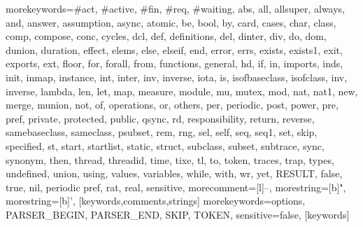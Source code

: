   {morekeywords={\#act, \#active, \#fin, \#req, \#waiting, abs, all, allsuper, always, and, answer, 
     assumption, async, atomic, be, bool, by, card, cases, char, class, comp, compose, conc, cycles,
     dcl, def, definitions, del, dinter, div, do, dom, dunion, duration, effect, elems, else, elseif, end,
     error, errs, exists, exists1, exit, exports, ext, floor, for, forall, from, functions, 
     general, hd, if, in, imports, inds, init, inmap, instance, int, inter, inv, inverse, iota, is, 
     isofbaseclass, isofclass, inv, inverse, lambda, len, let, map,
     measure, module,
     mu, mutex, mod, nat, nat1, new, merge, 
     munion, not, of, operations, or, others, per, periodic, post, power, pre, pref, 
     private, protected, public, qsync, rd, responsibility, return, reverse, samebaseclass, 
     sameclass, psubset, rem, rng, sel, self, seq, seq1, set, skip, specified, st, 
     start, startlist, static, struct, subclass, subset, subtrace, sync, synonym, then, thread, 
     threadid, time, tixe, tl, to, token, traces, trap, types, undefined, union, using, values, 
     variables, while, with, wr, yet, RESULT, false, true, nil, periodic pref, rat, real},
   sensitive,
   morecomment=[l]--,
   morestring=[b]",
   morestring=[b]',
  }[keywords,comments,strings]
  {morekeywords={options, PARSER\_BEGIN, PARSER\_END, SKIP, TOKEN},
   sensitive=false,
  }[keywords]
